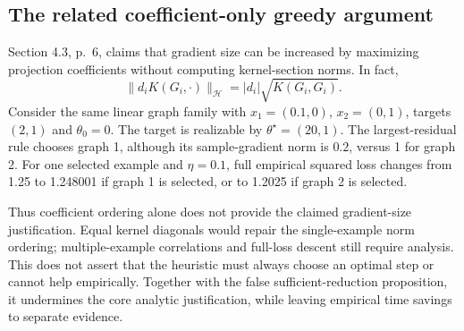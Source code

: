 \documentclass[10pt]{article}
\begin{document}
\subsection*{The related coefficient-only greedy argument}
Section 4.3, p. 6, claims that gradient size can be increased by maximizing projection coefficients without computing kernel-section norms. In fact, \[\|d_i K(G_i,\cdot)\|_{\mathcal H}
 =|d_i|\sqrt{K(G_i,G_i)}.\] Consider the same linear graph family with \(x_1=(0.1,0)\), \(x_2=(0,1)\), targets \((2,1)\) and \(\theta_0=0\). The target is realizable by \(\theta^\star=(20,1)\). The largest-residual rule chooses graph 1, although its sample-gradient norm is \(0.2\), versus 1 for graph 2. For one selected example and \(\eta=0.1\), full empirical squared loss changes from 1.25 to 1.248001 if graph 1 is selected, or to 1.2025 if graph 2 is selected.\par
Thus coefficient ordering alone does not provide the claimed gradient-size justification. Equal kernel diagonals would repair the single-example norm ordering; multiple-example correlations and full-loss descent still require analysis. This does not assert that the heuristic must always choose an optimal step or cannot help empirically. Together with the false sufficient-reduction proposition, it undermines the core analytic justification, while leaving empirical time savings to separate evidence.\par
\end{document}
